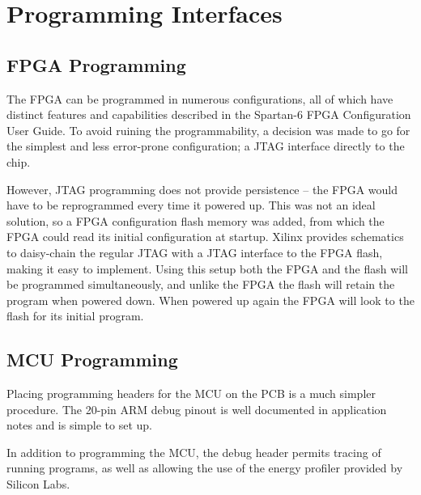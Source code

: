 
\section{Programming Interfaces}

\subsection{FPGA Programming}
The FPGA can be programmed in numerous configurations, all of which have
distinct features and capabilities described in the 
Spartan-6 FPGA Configuration User Guide. To avoid ruining the programmability, a
decision was made to go for the simplest and less error-prone configuration; a
JTAG interface directly to the chip.

However, JTAG programming does not provide persistence -- the FPGA would have to
be reprogrammed every time it powered up. This was not an ideal solution, so a
FPGA configuration flash memory was added, from which the FPGA could read its
initial configuration at startup. Xilinx provides schematics to daisy-chain the
regular JTAG with a JTAG interface to the FPGA flash, making it easy to
implement. Using this setup both the FPGA and the flash will be programmed
simultaneously, and unlike the FPGA the flash will retain the program when
powered down. When powered up again the FPGA will look to the flash for its
initial program.

\subsection{MCU Programming}
Placing programming headers for the MCU on the PCB is a much simpler procedure.
The 20-pin ARM debug pinout is well documented in application notes and is
simple to set up.

In addition to programming the MCU, the debug header permits tracing of running
programs, as well as allowing the use of the energy profiler provided by Silicon Labs.

